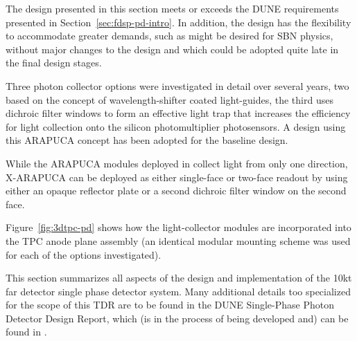 

The  design presented in this section meets or exceeds the DUNE requirements presented in Section~\ref{sec:fdsp-pd-intro}. In addition, the design has the flexibility to accommodate greater demands, such as might be desired for SBN physics, without major changes to the design and which could be adopted quite late in the final design stages.

Three photon collector options were investigated in detail over several years, two based on the concept of wavelength-shifter coated light-guides, the third uses dichroic filter windows to form an effective light trap that increases the efficiency for light collection onto the silicon photomultiplier photosensors. A design using this ARAPUCA concept has been adopted for the baseline design.

While the ARAPUCA modules deployed in  collect light from only one direction, X-ARAPUCA can be deployed as either single-face or two-face readout by using either an opaque reflector plate or a second dichroic filter window on the second face.

Figure~\ref{fig:3dtpc-pd} shows how the light-collector modules are incorporated into the TPC anode plane assembly (an identical modular mounting scheme was used for each of the options investigated). 


This section summarizes all aspects of the design and implementation of the 10kt far detector single phase detector system.  Many additional details too specialized for the scope of this TDR are to be found in the DUNE Single-Phase Photon Detector Design Report, which (is in the process of being developed and) can be found in .


